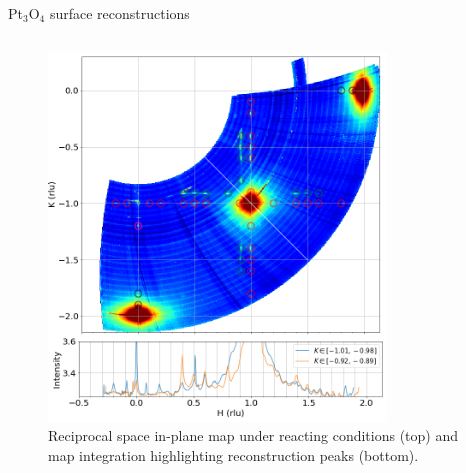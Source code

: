 \begin{frame}{Pt$_3$O$_4$ surface reconstructions}
\begin{columns}

    \begin{figure}
        \centering
        \includegraphics[width=0.8\textwidth]{Figures/sxrd_data/maps/band_in_k_reconstructions.png}
        \caption{Reciprocal space in-plane map under reacting conditions (top) and map integration highlighting reconstruction peaks (bottom).}
        \label{fig:CondE2}
    \end{figure}
    \end{columns}
    
\end{frame}
